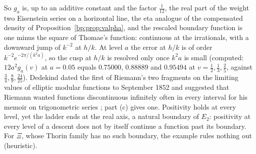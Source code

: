 So $g_a$ is, up to an additive constant and the factor $\frac1{12}$, the real part of the weight two Eisenstein series on a horizontal line, the eta analogue of the compensated density of Proposition~\ref{bp:prop:valpha}, and the rescaled boundary function is one minus the square of Thomae's function: continuous at the irrationals, with a downward jump of $k^{-2}$ at $h/k$. At level $a$ the error at $h/k$ is of order $k^{-2}e^{-2\pi/(k^2a)}$, so the cusp at $h/k$ is resolved only once $k^2a$ is small (computed: $12a^2g_a(v)$ at $a=0.05$ equals $0.75000$, $0.88889$ and $0.95494$ at $v=\frac12,\frac13,\frac25$, against $\frac34,\frac89,\frac{24}{25}$). Dedekind dated the first of Riemann's two fragments on the limiting values of elliptic modular functions to September 1852 and suggested that Riemann wanted functions discontinuous infinitely often in every interval for his memoir on trigonometric series \cite{Dedekind1892}; part (c) gives one. Positivity holds at every level, yet the ladder ends at the real axis, a natural boundary of $E_2$: positivity at every level of a descent does not by itself continue a function past its boundary. For $\Xi$, whose Thorin family has no such boundary, the example rules nothing out (heuristic).

